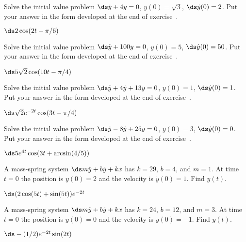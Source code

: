 \begin{exercises}
\begin{exercise}
\begin{exercise}
\begin{exercise}
\begin{exercise}
\begin{answer}
\end{answer}\end{exercise}
\begin{exercise} Solve the initial value problem 
$\ds\ddot y+4y=0$,
$y(0)=\sqrt3$, $\ds\dot y(0)=2$. Put your answer in the form developed
at the end of exercise~.
\begin{answer} $\ds 2\cos(2t-\pi/6)$
\end{answer}\end{exercise}
\begin{exercise} Solve the initial value problem 
$\ds\ddot y+100y=0$,
$y(0)=5$, $\ds\dot y(0)=50$. Put your answer in the form developed
at the end of exercise~.
\begin{answer} $\ds 5\sqrt2\cos(10t-\pi/4)$
\end{answer}\end{exercise}
\begin{exercise} Solve the initial value problem 
$\ds\ddot y+4\dot y+13y=0$,
$y(0)=1$, $\ds\dot y(0)=1$. Put your answer in the form developed
at the end of exercise~.
\begin{answer} $\ds \sqrt2 e^{-2t}\cos(3t-\pi/4)$
\end{answer}\end{exercise}
\begin{exercise} Solve the initial value problem 
$\ds\ddot y-8\dot y+25y=0$,
$y(0)=3$, $\ds\dot y(0)=0$. Put your answer in the form developed
at the end of exercise~.
\begin{answer} $\ds 5e^{4t}\cos(3t+\arcsin(4/5))$
\end{answer}\end{exercise}
\begin{exercise} A mass-spring system $\ds m\ddot y+b\dot y+kx$ has
$k=29$, $b=4$, and $m=1$. At time $t=0$ the position is $y(0)=2$ and
the velocity is $\dot y(0)=1$. Find $y(t)$.
\begin{answer} $\ds (2\cos(5t)+\sin(5t))e^{-2t}$
\end{answer}\end{exercise}
\begin{exercise} A mass-spring system $\ds m\ddot y+b\dot y+kx$ has
$k=24$, $b=12$, and $m=3$. At time $t=0$ the position is $y(0)=0$ and
the velocity is $\dot y(0)=-1$. Find $y(t)$.
\begin{answer} $\ds-(1/2)e^{-2t}\sin(2t)$
\end{answer}\end{exercise}


\end{exercise}
\end{exercise}
\end{exercise}
\end{exercises}
